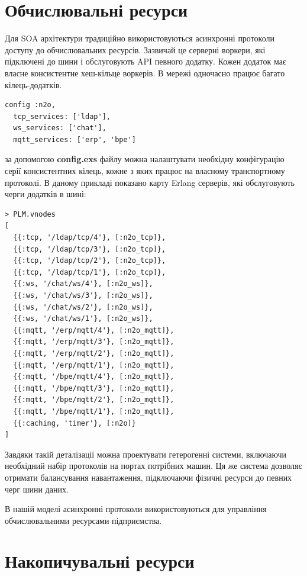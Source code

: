 \newpage
\section{Обчислювальні ресурси}

Для SOA архітектури традиційно використовуються асинхронні
протоколи доступу до обчислювальних ресурсів. Зазвичай це серверні
воркери, які підключені до шини і обслуговують API певного додатку.
Кожен додаток має власне консистентне хеш-кільце воркерів. В мережі
одночасно працює багато кілець-додатків.

\begin{lstlisting}
config :n2o,
  tcp_services: ['ldap'],
  ws_services: ['chat'],
  mqtt_services: ['erp', 'bpe']
   \end{lstlisting}

за допомогою {\bf config.exs} файлу можна налаштувати необхідну
конфігурацію серії консистентних кілець, кожне з яких працює
на власному транспортному протоколі. В даному прикладі показано
карту Erlang серверів, які обслуговують черги додатків в шині:

\begin{lstlisting}
> PLM.vnodes
[
  {{:tcp, '/ldap/tcp/4'}, [:n2o_tcp]},
  {{:tcp, '/ldap/tcp/3'}, [:n2o_tcp]},
  {{:tcp, '/ldap/tcp/2'}, [:n2o_tcp]},
  {{:tcp, '/ldap/tcp/1'}, [:n2o_tcp]},
  {{:ws, '/chat/ws/4'}, [:n2o_ws]},
  {{:ws, '/chat/ws/3'}, [:n2o_ws]},
  {{:ws, '/chat/ws/2'}, [:n2o_ws]},
  {{:ws, '/chat/ws/1'}, [:n2o_ws]},
  {{:mqtt, '/erp/mqtt/4'}, [:n2o_mqtt]},
  {{:mqtt, '/erp/mqtt/3'}, [:n2o_mqtt]},
  {{:mqtt, '/erp/mqtt/2'}, [:n2o_mqtt]},
  {{:mqtt, '/erp/mqtt/1'}, [:n2o_mqtt]},
  {{:mqtt, '/bpe/mqtt/4'}, [:n2o_mqtt]},
  {{:mqtt, '/bpe/mqtt/3'}, [:n2o_mqtt]},
  {{:mqtt, '/bpe/mqtt/2'}, [:n2o_mqtt]},
  {{:mqtt, '/bpe/mqtt/1'}, [:n2o_mqtt]},
  {{:caching, 'timer'}, [:n2o]}
]
\end{lstlisting}

Завдяки такій деталізації можна проектувати гетерогенні системи,
включаючи необхідний набір протоколів на портах потрібних машин. Ця же система
дозволяє отримати балансування навантаження, підключаючи фізичні ресурси
до певних черг шини даних.

В нашій моделі асинхронні протоколи використовуються для управління
обчислювальними ресурсами підприємства.

\newpage
\section{Накопичувальні ресурси}

